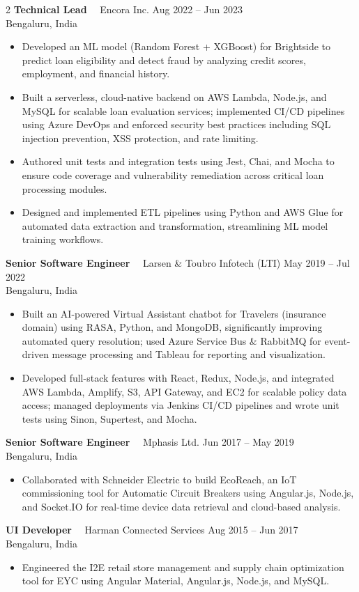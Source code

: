 \documentclass[10pt,a4paper]{article}
\newcommand{\job}[4]{%
  \vspace{2pt}
  {\fontsize{10}{11.5}\bfseries\color{sidebar}#1}
  {\color{textmuted}\ \textbar\ #2}
  \hfill
  {\fontsize{8.5}{10}\color{accent}#3}\\
  {\fontsize{8.4}{10}\color{textmuted}#4}
  \vspace{1pt}
}
\begin{document}
\begin{paracol}{2}
\job{Technical Lead}{Encora Inc.}{Aug 2022 -- Jun 2023}{Bengaluru, India}
\begin{itemize}
  \item Developed an ML model (Random Forest + XGBoost) for Brightside to predict loan eligibility and detect fraud by analyzing credit scores, employment, and financial history.
  \item Built a serverless, cloud-native backend on AWS Lambda, Node.js, and MySQL for scalable loan evaluation services; implemented CI/CD pipelines using Azure DevOps and enforced security best practices including SQL injection prevention, XSS protection, and rate limiting.
  \item Authored unit tests and integration tests using Jest, Chai, and Mocha to ensure code coverage and vulnerability remediation across critical loan processing modules.
  \item Designed and implemented ETL pipelines using Python and AWS Glue for automated data extraction and transformation, streamlining ML model training workflows.
\end{itemize}

\job{Senior Software Engineer}{Larsen \& Toubro Infotech (LTI)}{May 2019 -- Jul 2022}{Bengaluru, India}
\begin{itemize}
  \item Built an AI-powered Virtual Assistant chatbot for Travelers (insurance domain) using RASA, Python, and MongoDB, significantly improving automated query resolution; used Azure Service Bus \& RabbitMQ for event-driven message processing and Tableau for reporting and visualization.
  \item Developed full-stack features with React, Redux, Node.js, and integrated AWS Lambda, Amplify, S3, API Gateway, and EC2 for scalable policy data access; managed deployments via Jenkins CI/CD pipelines and wrote unit tests using Sinon, Supertest, and Mocha.
\end{itemize}

\job{Senior Software Engineer}{Mphasis Ltd.}{Jun 2017 -- May 2019}{Bengaluru, India}
\begin{itemize}
  \item Collaborated with Schneider Electric to build EcoReach, an IoT commissioning tool for Automatic Circuit Breakers using Angular.js, Node.js, and Socket.IO for real-time device data retrieval and cloud-based analysis.
\end{itemize}

\job{UI Developer}{Harman Connected Services}{Aug 2015 -- Jun 2017}{Bengaluru, India}
\begin{itemize}
  \item Engineered the I2E retail store management and supply chain optimization tool for EYC using Angular Material, Angular.js, Node.js, and MySQL.
\end{itemize}


\end{paracol}
\end{document}
